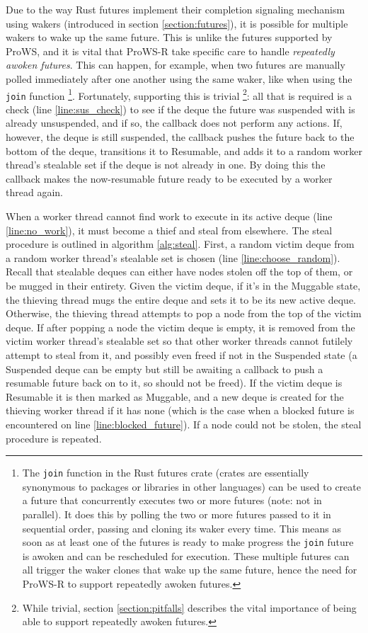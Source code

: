 \documentclass[bsc,frontabs,singlespacing,parskip,deptreport,normalheadings]{infthesis}
\begin{document}
Due to the way Rust futures implement their completion signaling mechanism using
wakers (introduced in section \ref{section:futures}), it is possible for
multiple wakers to wake up the same future. This is unlike the futures supported
by ProWS, and it is vital that ProWS-R take specific care to handle
\textit{repeatedly awoken futures}. This can happen, for
example, when two futures are manually polled immediately after one another
using the same waker, like when using the \texttt{join} function \footnote{The
    \texttt{join} function in the Rust futures crate \cite{noauthor_join_nodate}
    (crates are essentially synonymous to packages or libraries in other
    languages) can be used to create a future that concurrently executes two or
    more futures (note: not in parallel). It does this by polling the two or
    more futures passed to it in sequential order, passing and cloning its waker
    every time. This means as soon as at least one of the futures is ready to
    make progress the \texttt{join} future is awoken and can be rescheduled for
    execution. These multiple futures can all trigger the waker clones that wake
    up the same future, hence the need for ProWS-R to support repeatedly awoken
futures.}. Fortunately, supporting this is trivial \footnote{While trivial, section
\ref{section:pitfalls} describes the vital importance of being able to support
repeatedly awoken futures.}: all that is required is a
check (line \ref{line:sus_check}) to see if the deque the future was suspended
with is already unsuspended, and if so, the callback does not perform any
actions. If, however, the deque is still suspended, the callback pushes the
future back to the bottom of the deque, transitions it to Resumable, and adds it
to a random worker thread's stealable set if the deque is not already in one. By
doing this the callback makes the now-resumable future ready to be executed by a
worker thread again.

When a worker thread cannot find work to execute in its active deque (line
\ref{line:no_work}), it must become a thief and steal from elsewhere. The steal
procedure is outlined in algorithm \ref{alg:steal}. First, a random victim deque
from a random worker thread's stealable set is chosen (line
\ref{line:choose_random}). Recall that stealable deques can either have nodes
stolen off the top of them, or be mugged in their entirety. Given the victim
deque, if it's in the Muggable state, the thieving thread mugs the entire
deque and sets it to be its new active deque. Otherwise, the thieving thread
attempts to pop a node from the top of the victim deque. If after popping a node
the victim deque is empty, it is removed from the victim worker thread's
stealable set so that other worker threads cannot futilely attempt to steal from
it, and possibly even freed if not in the Suspended state (a Suspended deque can
be empty but still be awaiting a callback to push a resumable future back on to
it, so should not be freed). If the victim deque is Resumable it is then marked
as Muggable, and a new deque is created for the thieving worker thread if it has
none (which is the case when a blocked future is encountered on line
\ref{line:blocked_future}). If a node could not be stolen, the steal procedure
is repeated.
\end{document}
